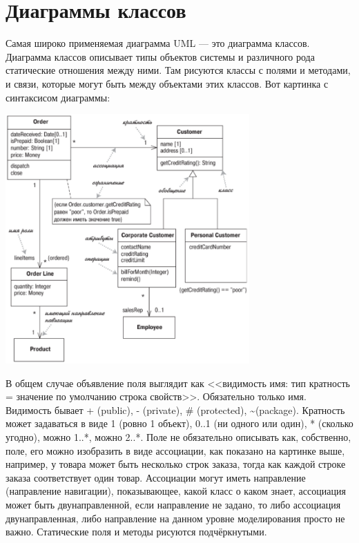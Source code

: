 \documentclass[a5paper]{article}
\begin{document}
\section{Диаграммы классов}

Самая широко применяемая диаграмма UML --- это диаграмма классов. Диаграмма классов описывает типы объектов системы и различного рода статические отношения между ними. Там рисуются классы с полями и методами, и связи, которые могут быть между объектами этих классов. Вот картинка с синтаксисом диаграммы:

\begin{center}
    \includegraphics[width=0.7\textwidth]{umlClassDiagram.png}
\end{center}

В общем случае объявление поля выглядит как <<видимость имя: тип кратность = значение по умолчанию {строка свойств}>>. Обязательно только имя. Видимость бывает + (public), - (private), \# (protected), \textasciitilde (package). Кратность может задаваться в виде 1 (ровно 1 объект), 0..1 (ни одного или один), * (сколько угодно), можно 1..*, можно 2..*. Поле не обязательно описывать как, собственно, поле, его можно изобразить в виде ассоциации, как показано на картинке выше, например, у товара может быть несколько строк заказа, тогда как каждой строке заказа соответствует один товар. Ассоциации могут иметь направление (направление навигации), показывающее, какой класс о каком знает, ассоциация может быть двунаправленной, если направление не задано, то либо ассоциация двунаправленная, либо направление на данном уровне моделирования просто не важно. Статические поля и методы рисуются подчёркнутыми.
\end{document}
